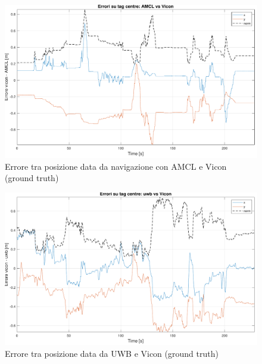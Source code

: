 \begin{figure}[] 
	\centering    
	\includegraphics[height=.3\textheight]{grafici_stanzavolo_vicon/figure11.pdf}
	\caption{Errore tra posizione data da navigazione con AMCL e Vicon (ground truth)}
	\label{fig: amclvic_err_vicon_charlie}
\end{figure}

\begin{figure}[] 
	\centering    
	\includegraphics[height=.3\textheight]{grafici_stanzavolo_vicon/figure10.pdf}
	\caption{Errore tra posizione data da UWB e Vicon (ground truth)}
	\label{fig: uwbvic_err_vicon_charlie}
\end{figure}

